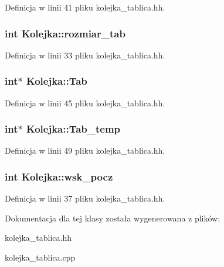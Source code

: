 \-Definicja w linii 41 pliku kolejka\-\_\-tablica.\-hh.

\hypertarget{class_kolejka_a72ba80c6ad16d9e2f5a8a02ec257524b}{
\subsubsection[{rozmiar\-\_\-tab}]{\setlength{\rightskip}{0pt plus 5cm}int {\bf \-Kolejka\-::rozmiar\-\_\-tab}}}\label{class_kolejka_a72ba80c6ad16d9e2f5a8a02ec257524b}


\-Definicja w linii 33 pliku kolejka\-\_\-tablica.\-hh.

\hypertarget{class_kolejka_adfbcda2500bf9d82a22d8d717ee6f695}{
\subsubsection[{\-Tab}]{\setlength{\rightskip}{0pt plus 5cm}int$\ast$ {\bf \-Kolejka\-::\-Tab}}}\label{class_kolejka_adfbcda2500bf9d82a22d8d717ee6f695}


\-Definicja w linii 45 pliku kolejka\-\_\-tablica.\-hh.

\hypertarget{class_kolejka_a5ec5307ce26f31ae9c29f91bd7527225}{
\subsubsection[{\-Tab\-\_\-temp}]{\setlength{\rightskip}{0pt plus 5cm}int$\ast$ {\bf \-Kolejka\-::\-Tab\-\_\-temp}}}\label{class_kolejka_a5ec5307ce26f31ae9c29f91bd7527225}


\-Definicja w linii 49 pliku kolejka\-\_\-tablica.\-hh.

\hypertarget{class_kolejka_a9fc9f63fded5c275d32f8b05125e8428}{
\subsubsection[{wsk\-\_\-pocz}]{\setlength{\rightskip}{0pt plus 5cm}int {\bf \-Kolejka\-::wsk\-\_\-pocz}}}\label{class_kolejka_a9fc9f63fded5c275d32f8b05125e8428}


\-Definicja w linii 37 pliku kolejka\-\_\-tablica.\-hh.



\-Dokumentacja dla tej klasy została wygenerowana z plików\-:\begin{DoxyCompactItemize}
\item 
kolejka\-\_\-tablica.\-hh\item 
kolejka\-\_\-tablica.\-cpp\end{DoxyCompactItemize}
